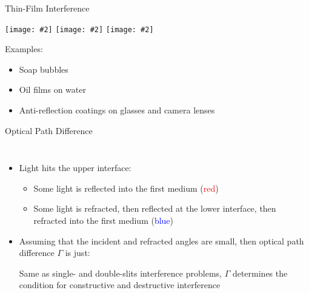 \documentclass[12pt,compress,aspectratio=169]{beamer}
\newcommand{\pic}[2]{\texttt{[image: \#2]}}
\newcommand{\eq}[2]{\vspace{#1}{\LARGE\begin{displaymath}#2\end{displaymath}}}
\begin{document}
\begin{frame}{Thin-Film Interference}
  \begin{center}
    \pic{.4}{soap-bubble.jpg}\hspace{.01in}
    \pic{.277}{oil-film.jpg}\hspace{.01in}
    \pic{.2265}{camera-lens.jpg}
  \end{center}
  Examples:
  \begin{itemize}
  \item Soap bubbles
  \item Oil films on water
  \item Anti-reflection coatings on glasses and camera lenses
  \end{itemize}
\end{frame}



\begin{frame}{Optical Path Difference}
  \begin{columns}
    
    \begin{itemize}
    \item Light hits the upper interface:
      \begin{itemize}
      \item Some light is reflected into the first medium
        (\textcolor{red}{red})
      \item Some light is refracted, then reflected at the lower interface,
        then refracted into the first medium (\textcolor{blue}{blue})
      \end{itemize}
    \item Assuming that the incident and refracted angles are small, then
      optical path difference $\Gamma$ is just:

    \eq{-.25in}{
      \Gamma=2t %
    }

    \vspace{-.15in}Same as single- and double-slits interference problems,
    $\Gamma$ determines the condition for constructive and destructive
    interference
    \end{itemize}
  \end{columns}
\end{frame}
\end{document}
